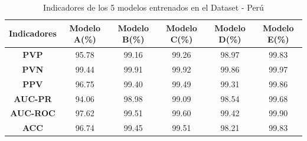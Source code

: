 		\begin{table}[H]
			\begin{center}
			\caption{\small{Indicadores de los 5 modelos entrenados en el Dataset - Perú}}
			\vspace{1.1em}
			\begin{tabular}{|c|c|c|c|c|c|}
			\cline{1-6}
			 \textbf{Indicadores}    & \textbf{Modelo A(\%)} & \textbf{Modelo B(\%)} & \textbf{Modelo C(\%)} &\textbf{ Modelo D(\%)} & \textbf{Modelo E(\%)} \\ \hline
			\multicolumn{1}{|c|}{\textbf{PVP}}        & 95.78     & 99.16       & 99.26       & 98.97       & 99.83       \\ \hline
			\multicolumn{1}{|c|}{\textbf{PVN}}        & 99.44     & 99.91       & 99.92       & 99.86       & 99.97       \\ \hline
			\multicolumn{1}{|c|}{\textbf{PPV}}        & 96.75     & 99.40       & 99.49       & 99.31       & 99.86       \\ \hline
			\multicolumn{1}{|c|}{\textbf{AUC-PR}}     & 94.06     & 98.98       & 99.09       & 98.54       & 99.68       \\ \hline
			\multicolumn{1}{|c|}{\textbf{AUC-ROC}}    & 97.62     & 99.51       & 99.60       & 99.42       & 99.90       \\ \hline
			\multicolumn{1}{|c|}{\textbf{ACC}}        & 96.74     & 99.45       & 99.51       & 98.21       & 99.83       \\ \hline
			\end{tabular}
			\end{center}
		\end{table}
